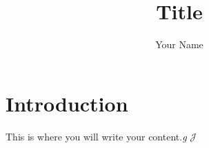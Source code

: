 \documentclass{article}
\title{Title}
\author{Your Name}
\begin{document}
\maketitle{}
  
\section{Introduction}

This is where you will write your content.\textit{g}  $\mathscr{J}$
\end{document}
